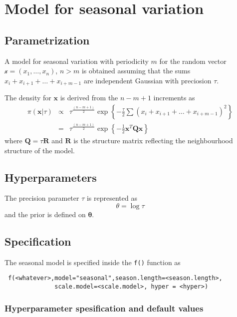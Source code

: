 \documentclass[a4paper,11pt]{article}
\begin{document}
\section*{Model for seasonal variation}

\subsection*{Parametrization}

A model for seasonal variation with periodicity $m$ for the random
vector $\mathcal{x}=(x_1,\dots,x_n)$, $n>m$ is obtained assuming that
the sums $x_i+x_{i+1}+\dots+x_{i+m-1}$ are independent Gaussian with
preciosion $\tau$.

The density for $\mathbf{x}$ is derived from the $n-m+1$ increments as
\begin{eqnarray}
    \pi(\mathbf{x}|\tau) &\propto& \tau^{\frac{(n-m+1)}{2}} \exp\left\{-\frac{\tau}{2}\sum (x_i+x_{i+1}+\dots+x_{i+m-1})^2\right\}\\
    & = &\tau^{\frac{(n-m+1)}{2}}\exp\left\{-\frac{1}{2}\mathbf{x}^T\mathbf{Q}\mathbf{x} \right\}
\end{eqnarray}
where $\mathbf{Q}=\tau\mathbf{R}$ and $\mathbf{R}$ is the structure
matrix reflecting the neighbourhood structure of the model.


\subsection*{Hyperparameters}

The precision parameter $\tau$ is represented as
\begin{displaymath}
    \theta =\log \tau
\end{displaymath}
and the prior is defined on $\mathbf{\theta}$. 

\subsection*{Specification}

The seasonal model is specified inside the {\tt f()} function as
\begin{verbatim}
 f(<whatever>,model="seasonal",season.length=<season.length>,
              scale.model=<scale.model>, hyper = <hyper>)
\end{verbatim}

\subsubsection*{Hyperparameter spesification and default values}

\end{document}

